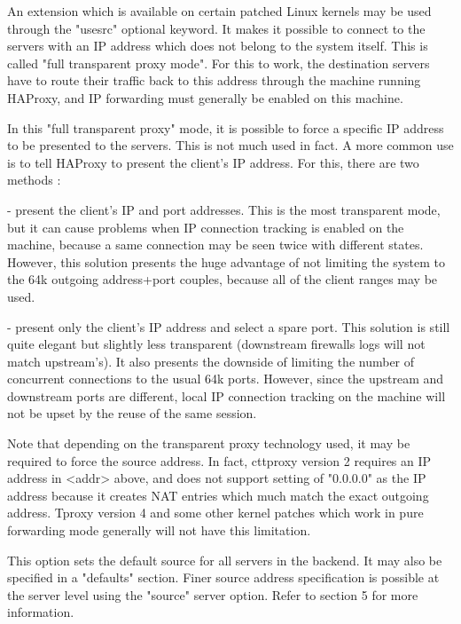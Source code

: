   An extension which is available on certain patched Linux kernels may be used
  through the "usesrc" optional keyword. It makes it possible to connect to the
  servers with an IP address which does not belong to the system itself. This
  is called "full transparent proxy mode". For this to work, the destination
  servers have to route their traffic back to this address through the machine
  running HAProxy, and IP forwarding must generally be enabled on this machine.

  In this "full transparent proxy" mode, it is possible to force a specific IP
  address to be presented to the servers. This is not much used in fact. A more
  common use is to tell HAProxy to present the client's IP address. For this,
  there are two methods :

    - present the client's IP and port addresses. This is the most transparent
      mode, but it can cause problems when IP connection tracking is enabled on
      the machine, because a same connection may be seen twice with different
      states. However, this solution presents the huge advantage of not
      limiting the system to the 64k outgoing address+port couples, because all
      of the client ranges may be used.

    - present only the client's IP address and select a spare port. This
      solution is still quite elegant but slightly less transparent (downstream
      firewalls logs will not match upstream's). It also presents the downside
      of limiting the number of concurrent connections to the usual 64k ports.
      However, since the upstream and downstream ports are different, local IP
      connection tracking on the machine will not be upset by the reuse of the
      same session.

  Note that depending on the transparent proxy technology used, it may be
  required to force the source address. In fact, cttproxy version 2 requires an
  IP address in <addr> above, and does not support setting of "0.0.0.0" as the
  IP address because it creates NAT entries which much match the exact outgoing
  address. Tproxy version 4 and some other kernel patches which work in pure
  forwarding mode generally will not have this limitation.

  This option sets the default source for all servers in the backend. It may
  also be specified in a "defaults" section. Finer source address specification
  is possible at the server level using the "source" server option. Refer to
  section 5 for more information.

